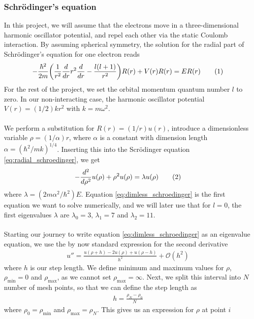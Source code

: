 \documentclass{article}
\newcommand\numberthis{\addtocounter{equation}{1}\tag{\theequation}}
\begin{document}
\subsubsection{Schrödinger's equation}
In this project, we will assume that the electrons move in a three-dimensional harmonic oscillator potential, and repel each other via the static Coulomb interaction. By assuming spherical symmetry, the solution for the radial part of Schrödinger's equation for one electron reads
\begin{align*}
  -\frac{\hbar^2}{2m}\bigg(\frac{1}{r^2}\frac{d}{dr}r^2\frac{d}{dr} - \frac{l(l+1)}{r^2}\bigg)R(r) + V(r)R(r) = ER(r)\numberthis\label{eq:radial_schroedinger}
\end{align*}
For the rest of the project, we set the orbital momentum quantum number $l$ to zero. In our non-interacting case, the harmonic oscillator potential $V(r) = (1/2)kr^2$ with $k=m\omega^2$.\\\\We perform a substitution for $R(r) = (1/r)u(r)$, introduce a dimensionless variable $\rho = (1/\alpha)r$, where $\alpha$ is a constant with dimension length $\alpha = (\hbar^2/mk)^{1/4}$. Inserting this into the Scrödinger equation \eqref{eq:radial_schroedinger}, we get
\begin{align*}
-\frac{d^2}{d\rho^2}u(\rho) + \rho^2u(\rho) = \lambda u(\rho)\numberthis\label{eq:dimless_schroedinger}
\end{align*}
where $\lambda = (2m\alpha^2/\hbar^2)E$. Equation \eqref{eq:dimless_schroedinger} is the first equation we want to solve numerically, and we will later use that for $l=0$, the first eigenvalues $\lambda$ are $\lambda_0 = 3$, $\lambda_1 = 7$ and $\lambda_2 = 11$.\\\\
Starting our journey to write equation \eqref{eq:dimless_schroedinger} as an eigenvalue equation, we use the by now standard expression for the second derivative
\begin{align*}
  u'' = \frac{u(\rho+h)-2u(\rho)+u(\rho-h)}{h^2}+\mathcal{O}(h^2)
\end{align*}
where $h$ is our step length. We define minimum and maximum values for $\rho$, $\rho_{\text{min}} = 0$ and $\rho_{\text{max}}$, as we cannot set $\rho_{\text{max}} = \infty$. Next, we split this interval into $N$ number of mesh points, so that we can define the step length as
\begin{align*}
  h = \frac{\rho_N-\rho_0}{N}
\end{align*}
where $\rho_0 = \rho_{\text{min}}$ and $\rho_{\text{max}} =\rho_N$. This gives us an expression for $\rho$ at point $i$
\end{document}
